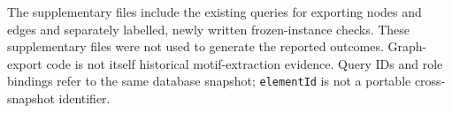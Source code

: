 

The supplementary files include the existing queries for exporting nodes and edges and separately labelled, newly written frozen-instance checks. These supplementary files were not used to generate the reported outcomes. Graph-export code is not itself historical motif-extraction evidence. Query IDs and role bindings refer to the same database snapshot; \texttt{elementId} is not a portable cross-snapshot identifier.
